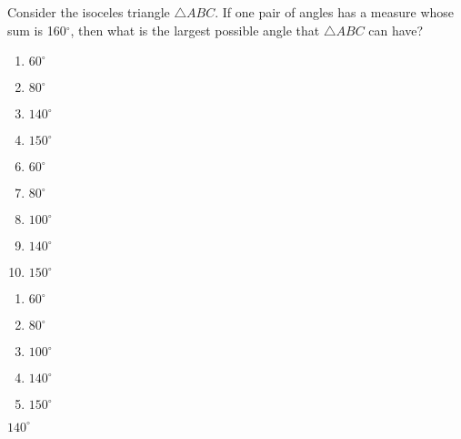 


  Consider the isoceles triangle $\triangle ABC$.  If one pair of angles has a measure whose sum is 160$^\circ$, then what is the largest possible angle that $\triangle ABC$ can have? 


\ifsat
	\begin{enumerate}[label=\Alph*)]
		\item  $60^\circ$
		\item    $80^\circ$ 
		\item  $140^\circ$ %
		\item  $150^\circ$ 
	\end{enumerate}
\else
\fi

\ifacteven
	\begin{enumerate}[label=\textbf{\Alph*.},itemsep=\fill,align=left]
		\setcounter{enumii}{5}
		\item  $60^\circ$
		\item    $80^\circ$ 
		\item  $100^\circ$ 
		\addtocounter{enumii}{1}
		\item  $140^\circ$ %
		\item  $150^\circ$ 
	\end{enumerate}
\else
\fi

\ifactodd
	\begin{enumerate}[label=\textbf{\Alph*.},itemsep=\fill,align=left]
		\item  $60^\circ$
		\item    $80^\circ$ 
		\item  $100^\circ$ 
		\item  $140^\circ$ %
		\item  $150^\circ$ 
	\end{enumerate}
\else
\fi

\ifgridin
  $140^\circ$ %
		
\else
\fi

